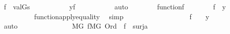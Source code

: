 \begin{isabellebody}
\ {\isacartoucheopen}f\ {\isacharequal}{\kern0pt}\ {\isacharbraceleft}{\kern0pt}{\isasymlangle}{\isasymbeta}{\isacharcomma}{\kern0pt}val{\isacharparenleft}{\kern0pt}G{\isacharcomma}{\kern0pt}s{\isacharbackquote}{\kern0pt}{\isasymbeta}{\isacharparenright}{\kern0pt}{\isasymrangle}\ {\isachardot}{\kern0pt}\ {\isasymbeta}{\isasymin}{\isasymalpha}{\isacharbraceright}{\kern0pt}{\isacartoucheclose}\ {\isacartoucheopen}{\isasymbeta}{\isasymin}{\isasymalpha}{\isacartoucheclose}\isanewline
\ \ \ \ \ \ \isamarkupfalse%
\ {\isachardoublequoteopen}{\isasymlangle}{\isasymbeta}{\isacharcomma}{\kern0pt}y{\isasymrangle}{\isasymin}f{\isachardoublequoteclose}\ \isanewline
\ \ \ \ \ \ \ \ \isamarkupfalse%
\ auto\isanewline
\ \ \ \ \ \ \isamarkupfalse%
\ {\isacartoucheopen}function{\isacharparenleft}{\kern0pt}f{\isacharparenright}{\kern0pt}{\isacartoucheclose}\isanewline
\ \ \ \ \ \ \isamarkupfalse%
\ {\isachardoublequoteopen}f{\isacharbackquote}{\kern0pt}{\isasymbeta}\ {\isacharequal}{\kern0pt}\ y{\isachardoublequoteclose}\isanewline
\ \ \ \ \ \ \ \ \isamarkupfalse%
\ function{\isacharunderscore}{\kern0pt}apply{\isacharunderscore}{\kern0pt}equality\ \isamarkupfalse%
\ simp\isanewline
\ \ \ \ \ \ \isamarkupfalse%
\ {\isacartoucheopen}{\isasymbeta}{\isasymin}{\isasymalpha}{\isacartoucheclose}\ \isamarkupfalse%
\isanewline
\ \ \ \ \ \ \ \ {\isachardoublequoteopen}{\isasymexists}{\isasymbeta}{\isasymin}{\isasymalpha}{\isachardot}{\kern0pt}\ f\ {\isacharbackquote}{\kern0pt}\ {\isasymbeta}\ {\isacharequal}{\kern0pt}\ y{\isachardoublequoteclose}\ \isanewline
\ \ \ \ \ \ \ \ \isamarkupfalse%
\ auto\isanewline
\ \ \ \ \isamarkupfalse%
\isanewline
\ \ \ \ \isamarkupfalse%
\isanewline
\ \ \ \ \isamarkupfalse%
\ {\isachardoublequoteopen}{\isasymexists}{\isasymalpha}{\isasymin}{\isacharparenleft}{\kern0pt}M{\isacharbrackleft}{\kern0pt}G{\isacharbrackright}{\kern0pt}{\isacharparenright}{\kern0pt}{\isachardot}{\kern0pt}\ {\isasymexists}f{\isacharprime}{\kern0pt}{\isasymin}{\isacharparenleft}{\kern0pt}M{\isacharbrackleft}{\kern0pt}G{\isacharbrackright}{\kern0pt}{\isacharparenright}{\kern0pt}{\isachardot}{\kern0pt}\ Ord{\isacharparenleft}{\kern0pt}{\isasymalpha}{\isacharparenright}{\kern0pt}\ {\isasymand}\ f{\isacharprime}{\kern0pt}\ {\isasymin}\ surj{\isacharparenleft}{\kern0pt}{\isasymalpha}{\isacharcomma}{\kern0pt}a{\isacharparenright}{\kern0pt}{\isachardoublequoteclose}\isanewline
\ \ \ \ \isamarkupfalse%

\end{isabellebody}
